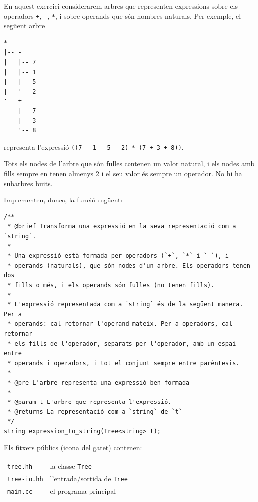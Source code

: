 
\Statement

En aquest exercici considerarem arbres que representen expressions 
sobre els operadors \verb|+|, \verb|-|, \verb|*|, i sobre operands 
que són nombres naturals. Per exemple, el següent arbre 

\begin{verbatim}
*
|-- -
|   |-- 7
|   |-- 1
|   |-- 5
|   '-- 2
'-- +
    |-- 7
    |-- 3
    '-- 8
\end{verbatim}

representa l'expressió \verb|((7 - 1 - 5 - 2) * (7 + 3 + 8))|.

\medskip

Tots els nodes de l'arbre que són fulles contenen un valor natural,
i els nodes amb fills sempre en tenen almenys 2 i el seu valor és 
sempre un operador. No hi ha subarbres buits.

Implementeu, doncs, la funció següent:

\begin{verbatim}
/**
 * @brief Transforma una expressió en la seva representació com a `string`.
 *
 * Una expressió està formada per operadors (`+`, `*` i `-`), i
 * operands (naturals), que són nodes d'un arbre. Els operadors tenen dos
 * fills o més, i els operands són fulles (no tenen fills).
 *
 * L'expressió representada com a `string` és de la següent manera. Per a
 * operands: cal retornar l'operand mateix. Per a operadors, cal retornar
 * els fills de l'operador, separats per l'operador, amb un espai entre
 * operands i operadors, i tot el conjunt sempre entre parèntesis.
 *
 * @pre L'arbre representa una expressió ben formada
 *
 * @param t L'arbre que representa l'expressió.
 * @returns La representació com a `string` de `t`
 */
string expression_to_string(Tree<string> t);  
\end{verbatim}

\Observation

Els fitxers públics (icona del gatet) contenen:

\medskip

\begin{tabular}{ll}
 \verb|tree.hh| & la classe \verb|Tree| \\
 \verb|tree-io.hh| & l'entrada/sortida de \verb|Tree| \\
 \verb|main.cc| & el programa principal \\
\end{tabular}

\medskip

